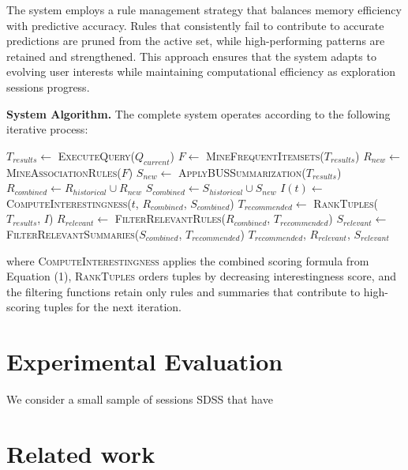 \documentclass[sigconf, nonacm]{acmart}
\begin{document}
The system employs a rule management strategy that balances memory efficiency with predictive accuracy. Rules that consistently fail to contribute to accurate predictions are pruned from the active set, while high-performing patterns are retained and strengthened. This approach ensures that the system adapts to evolving user interests while maintaining computational efficiency as exploration sessions progress.

\textbf{System Algorithm.} The complete system operates according to the following iterative process:

\begin{algorithmic}[1]
    \State $T_{results} \gets$ \textsc{ExecuteQuery}($Q_{current}$)
    \State $F \gets$ \textsc{MineFrequentItemsets}($T_{results}$)
    \State $R_{new} \gets$ \textsc{MineAssociationRules}($F$)
    \State $S_{new} \gets$ \textsc{ApplyBUSSummarization}($T_{results}$)
    \State $R_{combined} \gets R_{historical} \cup R_{new}$
    \State $S_{combined} \gets S_{historical} \cup S_{new}$
        \State $I(t) \gets$ \textsc{ComputeInterestingness}($t$, $R_{combined}$, $S_{combined}$)
    \EndFor
    \State $T_{recommended} \gets$ \textsc{RankTuples}($T_{results}$, $I$)
    \State $R_{relevant} \gets$ \textsc{FilterRelevantRules}($R_{combined}$, $T_{recommended}$)
    \State $S_{relevant} \gets$ \textsc{FilterRelevantSummaries}($S_{combined}$, $T_{recommended}$)
    \State \Return $T_{recommended}$, $R_{relevant}$, $S_{relevant}$
\EndProcedure
\end{algorithmic}

where \textsc{ComputeInterestingness} applies the combined scoring formula from Equation (1), \textsc{RankTuples} orders tuples by decreasing interestingness score, and the filtering functions retain only rules and summaries that contribute to high-scoring tuples for the next iteration.






\section{Experimental Evaluation}

We consider a small sample of sessions SDSS that have 

\section{Related work}
\end{document}
